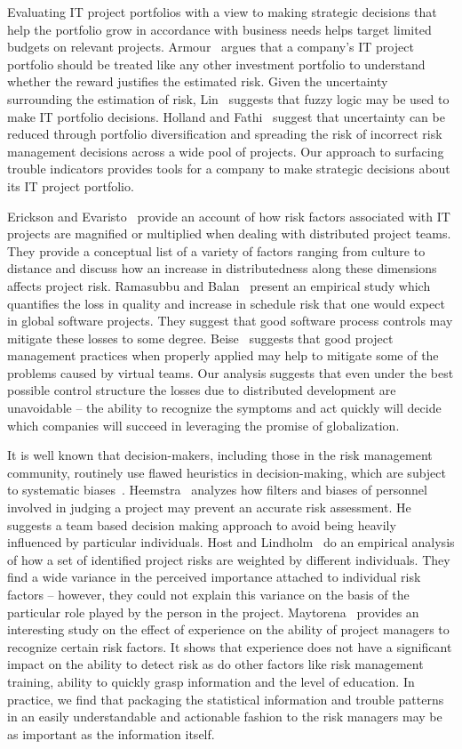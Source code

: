 Evaluating IT project portfolios with a view to making strategic decisions that help the portfolio grow in accordance with business needs helps target limited budgets on relevant projects. Armour~\cite{risk18} argues that a company’s IT project portfolio should be treated like any other investment portfolio to understand whether the reward justifies the estimated risk. Given the uncertainty surrounding the estimation of risk, Lin~\cite{risk20} suggests that fuzzy logic may be used to make IT portfolio decisions. Holland and Fathi~\cite{risk25} suggest that uncertainty can be reduced through portfolio diversification and spreading the risk of incorrect risk management decisions across a wide pool of projects. Our approach to surfacing trouble indicators provides tools for a company to make strategic decisions about its IT project portfolio.

Erickson and Evaristo~\cite{risk22} provide an account of how risk factors associated with IT projects are magnified or multiplied when dealing with distributed project teams.  They provide a conceptual list of a variety of factors ranging from culture to distance and discuss how an increase in distributedness along these dimensions affects project risk.  Ramasubbu and Balan~\cite{risk23} present an empirical study which quantifies the loss in quality and increase in schedule risk that one would expect in global software projects. They suggest that good software process controls may mitigate these losses to some degree. Beise~\cite{risk24} suggests that good project management practices when properly applied may help to mitigate some of the problems caused by virtual teams. Our analysis suggests that even under the best possible control structure the losses due to distributed development are unavoidable -- the ability to recognize the symptoms and act quickly will decide which  companies will succeed in leveraging the promise of globalization.

It is well known that decision-makers, including those in the risk management community, routinely use flawed heuristics in decision-making, which are subject to systematic biases~\cite{risk27}. Heemstra~\cite{risk24} analyzes how filters and biases of personnel involved in judging a project may prevent an accurate risk assessment. He suggests a team based decision making approach to avoid being heavily influenced by particular individuals. Host and Lindholm~\cite{risk25}  do an empirical analysis of how a set of identified project risks are weighted by different individuals. They find a wide variance in the perceived importance attached to individual risk factors -- however, they could not explain this variance on the basis of the particular role played by the person in the project. Maytorena~\cite{risk26} provides an interesting study on the effect of experience on the ability of project managers to recognize certain risk factors. It shows that experience does not have a significant impact on the ability to detect risk as do other factors like risk management training, ability to quickly grasp information and the level of education. In practice, we find that packaging the statistical information and trouble patterns in an easily understandable and actionable fashion to the risk managers may be as important as the information itself.

